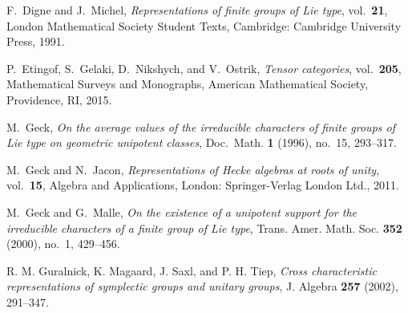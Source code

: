 \documentclass[eqthmnum,nocolour,skinny]{jt-calcs}
\begin{document}
\begin{thebibliography}{99}

{\sc F.~Digne and J.~Michel}, \emph{Representations of finite groups of Lie type}, vol.~{\bf 21}, London Mathematical Society Student Texts, Cambridge: Cambridge University Press, 1991.

{\sc P.~Etingof, S.~Gelaki, D.~Nikshych, and V.~Ostrik}, \emph{Tensor categories}, vol.~{\bf 205}, Mathematical Surveys and Monographs, American Mathematical Society, Providence, RI, 2015.

{\sc M.~Geck}, \emph{On the average values of the irreducible characters of finite groups of Lie type on geometric unipotent classes}, Doc.~Math. {\bf 1} (1996), no.~15, 293--317.


{\sc M.~Geck and N.~Jacon}, \emph{Representations of Hecke algebras at roots of unity}, vol.~{\bf 15}, Algebra and Applications, London: Springer-Verlag London Ltd., 2011.


{\sc M.~Geck and G.~Malle}, \emph{On the existence of a unipotent support for the irreducible characters of a finite group of Lie type}, Trans. Amer. Math. Soc. {\bf 352} (2000), no.~1, 429--456.


{\sc R. M. Guralnick, K. Magaard, J. Saxl, and P. H. Tiep}, {\it Cross characteristic representations of symplectic groups and unitary groups}, J. Algebra {\bf 257} (2002), 291--347.


\end{thebibliography}
\end{document}
